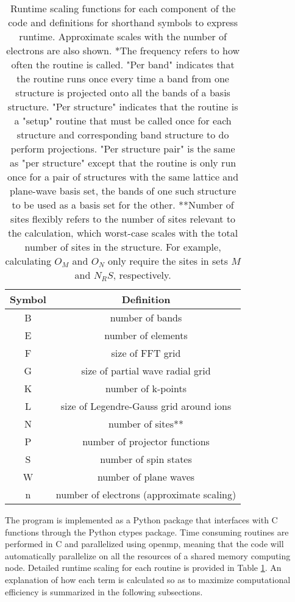 \documentclass[12pt]{article}
\begin{document}
\begin{table}
\begin{tabular}{c|c}
Symbol & Definition\\
\hline
B & number of bands\\
E & number of elements\\
F & size of FFT grid\\
G & size of partial wave radial grid\\
K & number of k-points\\
L & size of Legendre-Gauss grid around ions\\
N & number of sites**\\
P & number of projector functions\\
S & number of spin states\\
W & number of plane waves\\
n & number of electrons (approximate scaling)
\end{tabular}
\caption{Runtime scaling functions for each component of the code and
definitions for shorthand symbols to express runtime. Approximate
scales with the number of electrons are also shown.
*The frequency refers to how often the routine is called. "Per band"
indicates that the routine runs once every time a band from one structure
is projected onto all the bands of a basis structure. "Per structure"
indicates that the routine is a "setup" routine that must be called once
for each structure and corresponding band structure to do perform projections.
"Per structure pair" is the same as "per structure" except that the routine
is only run once for a pair of structures with the same lattice and plane-wave
basis set, the bands of one such structure to be used as a basis set for the other.
**Number of sites flexibly refers to the number of sites relevant to the calculation,
which worst-case scales with the total number of sites in the structure. For example,
calculating $O_M$ and $O_N$ only require the sites in sets $M$ and $N_RS$, respectively.}
\label{tab:runtime}
\end{table}

The program is implemented as a Python package that interfaces with C functions through
the Python ctypes package. Time consuming routines are performed in C and parallelized
using openmp, meaning that the code will automatically parallelize on all the resources
of a shared memory computing node. Detailed runtime scaling for each routine is
provided in Table \ref{tab:runtime}. An explanation of how each term is calculated
so as to maximize computational efficiency is summarized in the following subsections.
\end{document}
